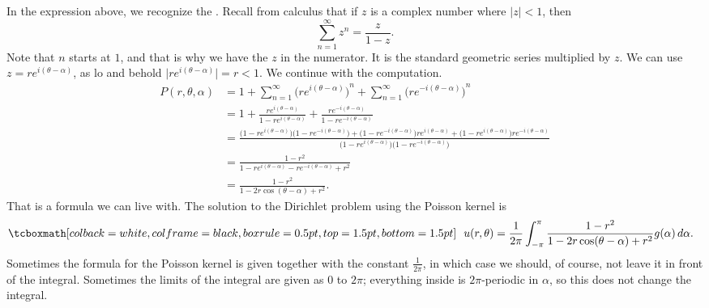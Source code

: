 In the expression above, we recognize the
\emph{}.
Recall from calculus that if $z$ is a complex number where $\lvert z \rvert < 1$, then
\begin{equation*}
\sum_{n=1}^\infty z^n = \frac{z}{1-z} .
\end{equation*}
Note that $n$ starts at $1$, and that is why we have the $z$ in the numerator.
It is the standard geometric series multiplied by $z$.
We can use $z = re^{i(\theta-\alpha)}$, as
lo and behold $\lvert re^{i(\theta-\alpha)} \rvert = r < 1$.
We continue with the computation.
\begin{equation*}
\begin{split}
P(r,\theta,\alpha)
& =
1
+
\sum_{n=1}^\infty
{\bigl(
re^{i(\theta-\alpha)}\bigr)}^{n}
+
\sum_{n=1}^\infty
{\bigl(
re^{-i(\theta-\alpha)}\bigr)}^{n}
\\
& =
1
+
\frac{re^{i(\theta-\alpha)}}{1-re^{i(\theta-\alpha)}}
+
\frac{re^{-i(\theta-\alpha)}}{1-re^{-i(\theta-\alpha)}}
\\
& = 
\frac{
\bigl(1-re^{i(\theta-\alpha)}\bigr)\bigl(1-re^{-i(\theta-\alpha)}\bigr)
+
\bigl(1-re^{-i(\theta-\alpha)}\bigr)re^{i(\theta-\alpha)} +
\bigl(1-re^{i(\theta-\alpha)}\bigr)re^{-i(\theta-\alpha)}}
{\bigl(1-re^{i(\theta-\alpha)}\bigr)\bigl(1-re^{-i(\theta-\alpha)}\bigr)}
\\
& = 
\frac{1 -r^2}{1 - re^{i(\theta-\alpha)} - re^{-i(\theta-\alpha)} +r^2}
\\
& = 
\frac{1 -r^2}{1 - 2r\cos(\theta-\alpha) +r^2} .
\end{split}
\end{equation*}
That is a formula we can live with.  The
solution to the Dirichlet problem using the Poisson kernel is
\begin{equation*}
\mybxbg{~~
u(r,\theta) = 
\frac{1}{2\pi} \int_{-\pi}^{\pi}
\frac{1 -r^2}{1 - 2r\cos(\theta-\alpha) +r^2} g(\alpha) \, d\alpha .
~~}
\end{equation*}
Sometimes the formula for the Poisson kernel is
given together with the constant $\frac{1}{2\pi}$, in which case we should,
of course, not leave it in front of the integral.
Sometimes the limits
of the integral are given as 0 to $2\pi$; everything inside is
$2\pi$-periodic in $\alpha$, so this does not change the integral.


